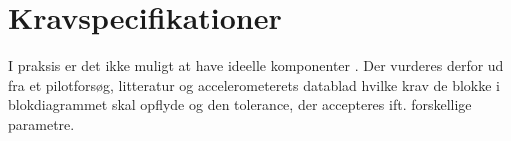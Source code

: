 \section{Kravspecifikationer}
I praksis er det ikke muligt at have ideelle komponenter \cite{Webster2009}. Der vurderes derfor ud fra et pilotforsøg, litteratur og accelerometerets datablad hvilke krav de blokke i blokdiagrammet skal opflyde og den tolerance, der accepteres ift. forskellige parametre.


